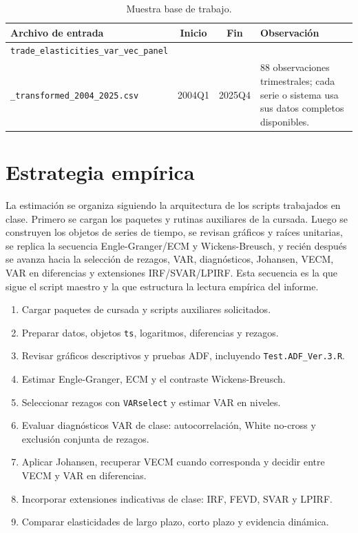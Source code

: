 \documentclass[11pt,a4paper]{article}
\begin{document}
	\begin{table}[H]
		\centering
		\caption{Muestra base de trabajo.}
		\label{tab:muestra-base}
		\small
		\begin{tabular}{p{6.2cm}ccp{5.0cm}}
			\toprule
			Archivo de entrada & Inicio & Fin & Observación \\
			\midrule
			\texttt{trade\_elasticities\_var\_vec\_panel}\\
			\texttt{\_transformed\_2004\_2025.csv}
			& 2004Q1 & 2025Q4 &
			88 observaciones trimestrales; cada serie o sistema usa sus datos completos disponibles. \\
			\bottomrule
		\end{tabular}
	\end{table}
	
	\section{Estrategia empírica}
	\label{sec:estrategia-empirica}
	
	La estimación se organiza siguiendo la arquitectura de los scripts trabajados
	en clase. Primero se cargan los paquetes y rutinas auxiliares de la cursada.
	Luego se construyen los objetos de series de tiempo, se revisan gráficos y
	raíces unitarias, se replica la secuencia Engle-Granger/ECM y Wickens-Breusch,
	y recién después se avanza hacia la selección de rezagos, VAR, diagnósticos,
	Johansen, VECM, VAR en diferencias y extensiones IRF/SVAR/LPIRF. Esta secuencia
	es la que sigue el script maestro y la que estructura la lectura empírica del
	informe.
	
	\begin{enumerate}
		\item Cargar paquetes de cursada y scripts auxiliares solicitados.
		\item Preparar datos, objetos \texttt{ts}, logaritmos, diferencias y rezagos.
		\item Revisar gráficos descriptivos y pruebas ADF, incluyendo
		\texttt{Test.ADF\_Ver.3.R}.
		\item Estimar Engle-Granger, ECM y el contraste Wickens-Breusch.
		\item Seleccionar rezagos con \texttt{VARselect} y estimar VAR en niveles.
		\item Evaluar diagnósticos VAR de clase: autocorrelación, White no-cross y
		exclusión conjunta de rezagos.
		\item Aplicar Johansen, recuperar VECM cuando corresponda y decidir entre
		VECM y VAR en diferencias.
		\item Incorporar extensiones indicativas de clase: IRF, FEVD, SVAR y LPIRF.
		\item Comparar elasticidades de largo plazo, corto plazo y evidencia dinámica.
	\end{enumerate}
	
\end{document}
